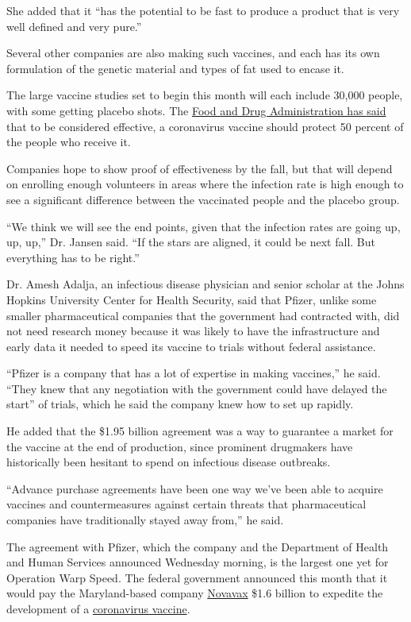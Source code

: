 She added that it ``has the potential to be fast to produce a product
that is very well defined and very pure.''

Several other companies are also making such vaccines, and each has its
own formulation of the genetic material and types of fat used to encase
it.

The large vaccine studies set to begin this month will each include
30,000 people, with some getting placebo shots. The
\href{https://www.fda.gov/regulatory-information/search-fda-guidance-documents/development-and-licensure-vaccines-prevent-covid-19}{Food
and Drug Administration has said} that to be considered effective, a
coronavirus vaccine should protect 50 percent of the people who receive
it.

Companies hope to show proof of effectiveness by the fall, but that will
depend on enrolling enough volunteers in areas where the infection rate
is high enough to see a significant difference between the vaccinated
people and the placebo group.

``We think we will see the end points, given that the infection rates
are going up, up, up,'' Dr. Jansen said. ``If the stars are aligned, it
could be next fall. But everything has to be right.''

Dr. Amesh Adalja, an infectious disease physician and senior scholar at
the Johns Hopkins University Center for Health Security, said that
Pfizer, unlike some smaller pharmaceutical companies that the government
had contracted with, did not need research money because it was likely
to have the infrastructure and early data it needed to speed its vaccine
to trials without federal assistance.

``Pfizer is a company that has a lot of expertise in making vaccines,''
he said. ``They knew that any negotiation with the government could have
delayed the start'' of trials, which he said the company knew how to set
up rapidly.

He added that the \$1.95 billion agreement was a way to guarantee a
market for the vaccine at the end of production, since prominent
drugmakers have historically been hesitant to spend on infectious
disease outbreaks.

``Advance purchase agreements have been one way we've been able to
acquire vaccines and countermeasures against certain threats that
pharmaceutical companies have traditionally stayed away from,'' he said.

The agreement with Pfizer, which the company and the Department of
Health and Human Services announced Wednesday morning, is the largest
one yet for Operation Warp Speed. The federal government announced this
month that it would pay the Maryland-based company
\href{https://www.nytimes3xbfgragh.onion/2020/07/16/health/coronavirus-vaccine-novavax.html}{Novavax}
\$1.6 billion to expedite the development of a
\href{https://www.nytimes3xbfgragh.onion/interactive/2020/science/coronavirus-vaccine-tracker.html}{coronavirus
vaccine}.

